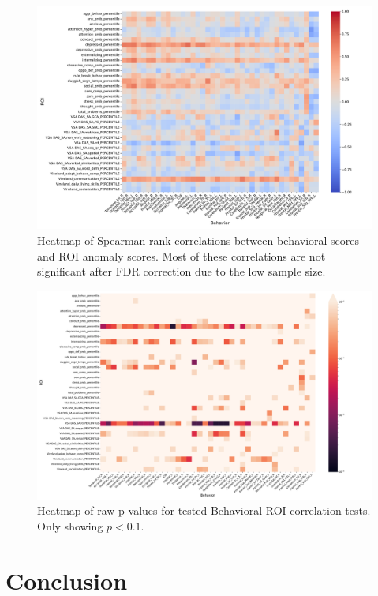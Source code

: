 \begin{figure}[tbhp]
\centering
\includegraphics[width=\linewidth]{figures/full_corrmatrix.pdf}
\caption{Heatmap of Spearman-rank correlations between behavioral scores and ROI anomaly scores. Most of these correlations are not significant after FDR correction due to the low sample size.}
\label{fig:full-roi-corr}
\end{figure}

\begin{figure}[tbhp]
\centering
\includegraphics[width=\linewidth]{figures/pmatrix.pdf}
\caption{Heatmap of raw p-values for tested Behavioral-ROI correlation tests. Only showing $p < 0.1$.}
\label{fig:full-roi-corr}
\end{figure}

\section{Conclusion}

